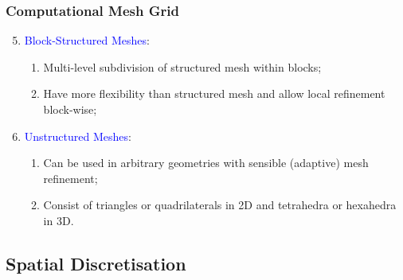 \documentclass[10pt,compress,handout,ignorenonframetext]{beamer}
\begin{document}
\begin{frame}
 \frametitle{Computational Mesh Grid} 
 \begin{enumerate}
   \setcounter{enumi}{4}    
   \item <1-> \textcolor{blue}{Block-Structured Meshes}:
    \begin{enumerate}
       \item <2-> Multi-level subdivision of structured mesh within blocks; 
       \item <3-> Have more flexibility than structured mesh and allow local refinement block-wise;
    \end{enumerate}    
   \item <4-> \textcolor{blue}{Unstructured Meshes}:
    \begin{enumerate}
       \item <5-> Can be used in arbitrary geometries with sensible (adaptive) mesh refinement;
       \item <6-> Consist of triangles or quadrilaterals in 2D and tetrahedra or hexahedra in 3D.
    \end{enumerate}  
 \end{enumerate}  

\end{frame}



 
\subsection{Spatial Discretisation}
\end{document}
